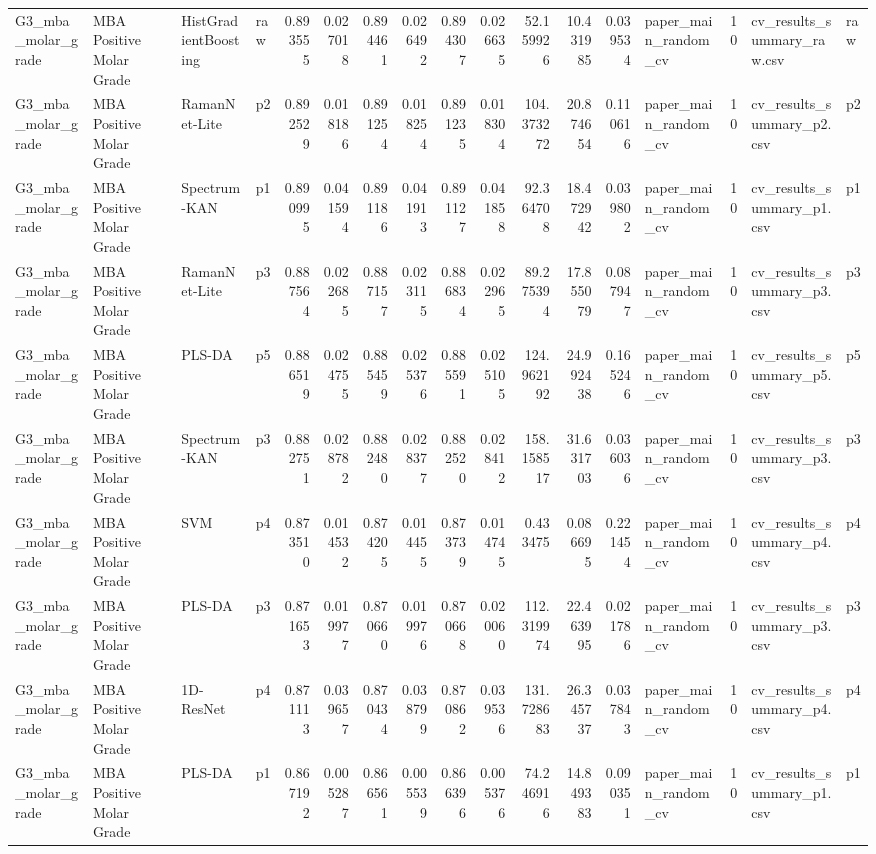\begin{tabular}{llllrrrrrrrrrlrll}
G3_mba_molar_grade & MBA Positive Molar Grade & HistGradientBoosting & raw & 0.893555 & 0.027018 & 0.894461 & 0.026492 & 0.894307 & 0.026635 & 52.159926 & 10.431985 & 0.039534 & paper_main_random_cv & 10 & cv_results_summary_raw.csv & raw \\
G3_mba_molar_grade & MBA Positive Molar Grade & RamanNet-Lite & p2 & 0.892529 & 0.018186 & 0.891254 & 0.018254 & 0.891235 & 0.018304 & 104.373272 & 20.874654 & 0.110616 & paper_main_random_cv & 10 & cv_results_summary_p2.csv & p2 \\
G3_mba_molar_grade & MBA Positive Molar Grade & Spectrum-KAN & p1 & 0.890995 & 0.041594 & 0.891186 & 0.041913 & 0.891127 & 0.041858 & 92.364708 & 18.472942 & 0.039802 & paper_main_random_cv & 10 & cv_results_summary_p1.csv & p1 \\
G3_mba_molar_grade & MBA Positive Molar Grade & RamanNet-Lite & p3 & 0.887564 & 0.022685 & 0.887157 & 0.023115 & 0.886834 & 0.022965 & 89.275394 & 17.855079 & 0.087947 & paper_main_random_cv & 10 & cv_results_summary_p3.csv & p3 \\
G3_mba_molar_grade & MBA Positive Molar Grade & PLS-DA & p5 & 0.886519 & 0.024755 & 0.885459 & 0.025376 & 0.885591 & 0.025105 & 124.962192 & 24.992438 & 0.165246 & paper_main_random_cv & 10 & cv_results_summary_p5.csv & p5 \\
G3_mba_molar_grade & MBA Positive Molar Grade & Spectrum-KAN & p3 & 0.882751 & 0.028782 & 0.882480 & 0.028377 & 0.882520 & 0.028412 & 158.158517 & 31.631703 & 0.036036 & paper_main_random_cv & 10 & cv_results_summary_p3.csv & p3 \\
G3_mba_molar_grade & MBA Positive Molar Grade & SVM & p4 & 0.873510 & 0.014532 & 0.874205 & 0.014455 & 0.873739 & 0.014745 & 0.433475 & 0.086695 & 0.221454 & paper_main_random_cv & 10 & cv_results_summary_p4.csv & p4 \\
G3_mba_molar_grade & MBA Positive Molar Grade & PLS-DA & p3 & 0.871653 & 0.019977 & 0.870660 & 0.019976 & 0.870668 & 0.020060 & 112.319974 & 22.463995 & 0.021786 & paper_main_random_cv & 10 & cv_results_summary_p3.csv & p3 \\
G3_mba_molar_grade & MBA Positive Molar Grade & 1D-ResNet & p4 & 0.871113 & 0.039657 & 0.870434 & 0.038799 & 0.870862 & 0.039536 & 131.728683 & 26.345737 & 0.037843 & paper_main_random_cv & 10 & cv_results_summary_p4.csv & p4 \\
G3_mba_molar_grade & MBA Positive Molar Grade & PLS-DA & p1 & 0.867192 & 0.005287 & 0.866561 & 0.005539 & 0.866396 & 0.005376 & 74.246916 & 14.849383 & 0.090351 & paper_main_random_cv & 10 & cv_results_summary_p1.csv & p1 \\

\end{tabular}
